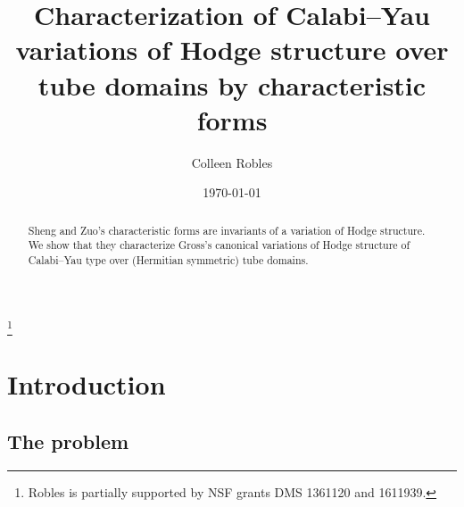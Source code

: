 \documentclass[12pt]{amsart}
\numberwithin{equation}{section}
\numberwithin{table}{section}
\numberwithin{figure}{section}
\begin{document}
\title[Characterization of CY VHS]{Characterization of Calabi--Yau variations of Hodge structure over tube domains by characteristic forms}
\author[Robles]{Colleen Robles}
\address{Mathematics Department, Duke University, Box 90320, Durham, NC  27708-0320} 
\thanks{Robles is partially supported by NSF grants DMS 1361120 and 1611939.}
\date{\today}
\begin{abstract}
Sheng and Zuo's characteristic forms are invariants of a variation of Hodge structure.  We show that they characterize Gross's canonical variations of Hodge structure of Calabi--Yau type over (Hermitian symmetric) tube domains.
\end{abstract}
{
}
\maketitle

\setcounter{tocdepth}{2}
\let\oldtocsection=\tocsection
\let\oldtocsubsection=\tocsubsection
\let\oldtocsubsubsection=\tocsubsubsection
\renewcommand{\tocsection}[2]{\hspace{0em}\oldtocsection{#1}{#2}}
\renewcommand{\tocsubsection}[2]{\hspace{3em}\oldtocsubsection{#1}{#2}}

\section{Introduction}

\subsection{The problem}
\end{document}
